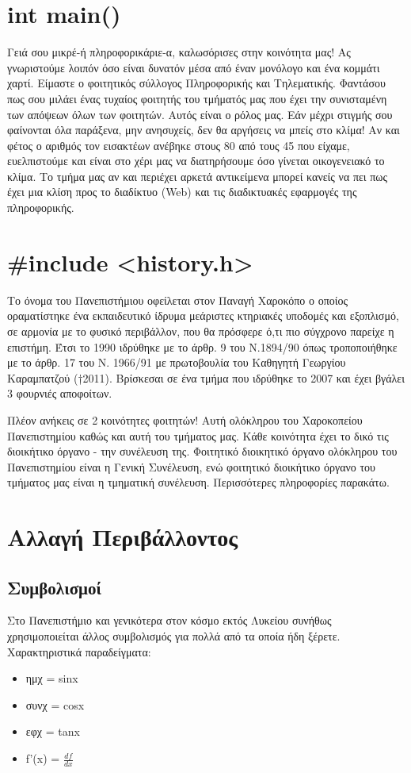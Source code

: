 \documentclass[legalpaper,10pt,a5paper]{article}
\newcounter{nextyear}
\begin{document}
\color{black!85}
\setcounter{nextyear}{\year}
\addtocounter{nextyear}{1}

\tableofcontents
\newpage
\section{int main()}
Γειά σου μικρέ-ή πληροφορικάριε-α, καλωσόρισες στην κοινότητα μας! Ας γνωριστούμε λοιπόν όσο είναι δυνατόν μέσα από έναν μονόλογο και ένα κομμάτι χαρτί. Είμαστε ο φοιτητικός σύλλογος 
Πληροφορικής και Τηλεματικής. Φαντάσου πως σου μιλάει ένας τυχαίος φοιτητής του τμήματός μας που έχει την συνισταμένη των απόψεων όλων των φοιτητών. Αυτός είναι ο ρόλος μας.
Εάν μέχρι στιγμής σου φαίνονται όλα παράξενα, μην ανησυχείς, δεν θα αργήσεις να μπείς στο κλίμα! Αν και φέτος ο αριθμός τον εισακτέων ανέβηκε στους 80 από τους 45 που είχαμε, ευελπιστούμε
και είναι στο χέρι μας να διατηρήσουμε όσο γίνεται οικογενειακό το κλίμα. 
Το τμήμα μας αν και περιέχει αρκετά αντικείμενα μπορεί κανείς να πει πως έχει μια κλίση προς το διαδίκτυο (Web) και τις διαδικτυακές εφαρμογές της πληροφορικής.


\section{\#include <history.h>}
Το όνομα του Πανεπιστήμιου οφείλεται στον Παναγή Χαροκόπο ο οποίος οραματίστηκε ένα εκπαιδευτικό ίδρυμα μεάριστες κτηριακές υποδομές και εξοπλισμό, σε αρμονία με το φυσικό περιβάλλον,
που θα πρόσφερε ό,τι πιο σύγχρονο παρείχε η επιστήμη. Έτσι το 1990 ιδρύθηκε με το άρθρ. 9 του Ν.1894/90 όπως τροποποιήθηκε με το άρθρ. 17 του Ν. 1966/91 με πρωτοβουλία του 
Καθηγητή Γεωργίου Καραμπατζού (†2011). Βρίσκεσαι σε ένα τμήμα που ιδρύθηκε το 2007 και έχει βγάλει 3 φουρνιές αποφοίτων. 

Πλέον ανήκεις σε 2 κοινότητες φοιτητών! Αυτή ολόκληρου του Χαροκοπείου Πανεπιστημίου καθώς και αυτή του τμήματος μας. Κάθε κοινότητα έχει το δικό τις διοικήτικο όργανο - την συνέλευση της.
Φοιτητικό διοικητικό όργανο ολόκληρου του Πανεπιστημίου είναι η Γενική Συνέλευση, ενώ φοιτητικό διοικήτικο όργανο του τμήματος μας είναι η τμηματική συνέλευση. Περισσότερες πληροφορίες παρακάτω.

\section{Αλλαγή Περιβάλλοντος}

\subsection{Συμβολισμοί}
Στο Πανεπιστήμιο και γενικότερα στον κόσμο εκτός Λυκείου συνήθως χρησιμοποιείται άλλος συμβολισμός για πολλά από τα οποία ήδη ξέρετε. Χαρακτηριστικά παραδείγματα:
\begin{itemize}
 \item ημχ = sinx
 \item συνχ = cosx
 \item εφχ = tanx
 \item f'(x) = $\frac{df}{dx}$
\end{itemize}
\end{document}
